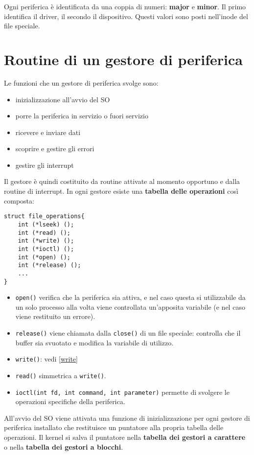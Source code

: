 \documentclass[12pt, a4paper]{report}
\begin{document}
Ogni periferica è identificata da una coppia di numeri: \textbf{major} e
\textbf{minor}. Il primo identifica il driver, il secondo il dispositivo.
Questi valori sono posti nell'inode del file speciale.

\section{Routine di un gestore di periferica}
Le funzioni che un gestore di periferica svolge sono:
\begin{itemize}
	\item inizializzazione all'avvio del SO
	\item porre la periferica in servizio o fuori servizio
	\item ricevere e inviare dati
	\item scoprire e gestire gli errori
	\item gestire gli interrupt
\end{itemize}
Il gestore è quindi costituito da routine attivate al momento opportuno e dalla
routine di interrupt. In ogni gestore esiste una \textbf{tabella delle
operazioni} così composta:
\begin{verbatim}
struct file_operations{
    int (*lseek) ();
    int (*read) ();
    int (*write) ();
    int (*ioctl) ();
    int (*open) ();
    int (*release) ();
    ...
}
\end{verbatim}
\begin{itemize}
	\item \texttt{open()} verifica che la periferica sia attiva, e nel caso
		questa si utilizzabile da un solo processo alla volta viene controllata
		un'apposita variabile (e nel caso viene restituito un errore).
	\item \texttt{release()} viene chiamata dalla \texttt{close()} di un file
		speciale: controlla che il buffer sia svuotato e modifica la variabile
		di utilizzo.
	\item \texttt{write()}: vedi \ref{write}
	\item \texttt{read()} simmetrica a \texttt{write()}.
	\item \texttt{ioctl(int fd, int command, int parameter)} permette di
		svolgere le operazioni specifiche della periferica.
\end{itemize}
All'avvio del SO viene attivata una funzione di inizializzazione per ogni
gestore di periferica installato che restituisce un puntatore alla propria
tabella delle operazioni. Il kernel si salva il puntatore nella \textbf{tabella
dei gestori a carattere} o nella \textbf{tabella dei gestori a blocchi}.
\end{document}

